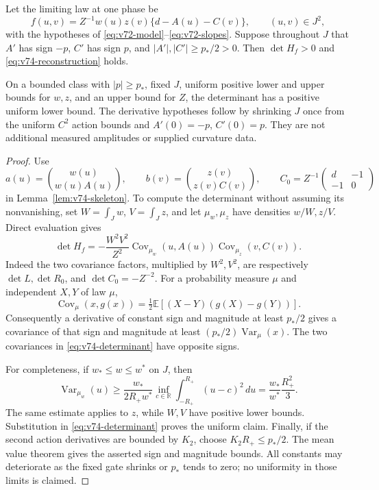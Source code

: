 \begin{proposition}\label{prop:v74-nondegeneracy}
Let the limiting law at one phase be
\begin{equation}\label{eq:v74-law}
 f(u,v)=Z^{-1}w(u)z(v)\{d-A(u)-C(v)\},\qquad (u,v)\in J^2,
\end{equation}
with the hypotheses of \eqref{eq:v72-model}--\eqref{eq:v72-slopes}.
Suppose throughout $J$ that $A'$ has sign $-p$, $C'$ has sign $p$,
and $|A'|,|C'|\ge p_*/2>0$.  Then $\det H_f>0$ and
\eqref{eq:v74-reconstruction} holds.

On a bounded class with $|p|\ge p_*$, fixed $J$, uniform positive
lower and upper bounds for $w,z$, and an upper bound for $Z$, the
determinant has a positive uniform lower bound.  The derivative
hypotheses follow by shrinking $J$ once from the uniform $C^2$ action
bounds and $A'(0)=-p$, $C'(0)=p$.  They are not additional measured
amplitudes or supplied curvature data.
\end{proposition}
\begin{proof}
Use
\[
 a(u)=\binom{w(u)}{w(u)A(u)},\qquad
 b(v)=\binom{z(v)}{z(v)C(v)},\qquad
 C_0=Z^{-1}\begin{pmatrix}d&-1\\-1&0\end{pmatrix}
\]
in Lemma~\ref{lem:v74-skeleton}.  To compute the determinant without
assuming its nonvanishing, set $W=\int_Jw$, $V=\int_Jz$, and let
$\mu_w,\mu_z$ have densities $w/W,z/V$.  Direct evaluation gives
\begin{equation}\label{eq:v74-determinant}
 \det H_f=-\frac{W^2V^2}{Z^2}
  \operatorname{Cov}_{\mu_w}(u,A(u))
  \operatorname{Cov}_{\mu_z}(v,C(v)).
\end{equation}
Indeed the two covariance factors, multiplied by $W^2,V^2$, are
respectively $\det L,\det R_0$, and $\det C_0=-Z^{-2}$.
For a probability measure $\mu$ and independent $X,Y$ of law $\mu$,
\[
 \operatorname{Cov}_{\mu}(x,g(x))
       =\tfrac12\mathbb E[(X-Y)(g(X)-g(Y))].
\]
Consequently a derivative of constant sign and magnitude at least
$p_*/2$ gives a covariance of that sign and magnitude at least
$(p_*/2)\operatorname{Var}_{\mu}(x)$.  The two covariances in
\eqref{eq:v74-determinant} have opposite signs.

For completeness, if $w_*\le w\le w^*$ on $J$, then
\[
 \operatorname{Var}_{\mu_w}(u)
 \ge\frac{w_*}{2R_+w^*}\inf_{c\in\mathbb R}
                      \int_{-R_+}^{R_+}(u-c)^2\,du
 =\frac{w_*}{w^*}\frac{R_+^2}{3}.
\]
The same estimate applies to $z$, while $W,V$ have positive lower
bounds.  Substitution in \eqref{eq:v74-determinant} proves the uniform
claim.  Finally, if the second action derivatives are bounded by $K_2$,
choose $K_2R_+\le p_*/2$.  The mean value theorem gives the asserted
sign and magnitude bounds.  All constants may deteriorate as the fixed
gate shrinks or $p_*$ tends to zero; no uniformity in those limits is
claimed.
\end{proof}

